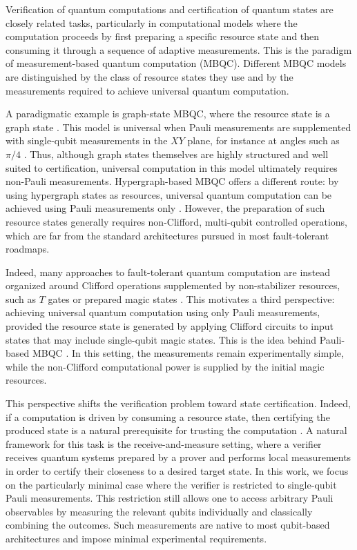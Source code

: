 \documentclass[a4paper,twocolumn,11pt,unpublished]{quantumarticle}
\begin{document}
Verification of quantum computations and certification of quantum states are closely related tasks, particularly in computational models where the computation proceeds by first preparing a specific resource state and then consuming it through a sequence of adaptive measurements. This is the paradigm of measurement-based quantum computation (MBQC). Different MBQC models are distinguished by the class of resource states they use and by the measurements required to achieve universal quantum computation.

A paradigmatic example is graph-state MBQC, where the resource state is a graph state
\cite{RB01one}. This model is universal when Pauli measurements are supplemented with single-qubit measurements in the $XY$ plane, for instance at angles such as $\pi/4$ \cite{DKP07measurement}. Thus, although graph states themselves are highly structured and well suited to certification, universal computation in this model ultimately requires non-Pauli measurements. Hypergraph-based MBQC offers a different route: by using hypergraph states as resources, universal quantum computation can be achieved using Pauli measurements only \cite{TMH18quantum}. However, the preparation of such resource states generally requires non-Clifford, multi-qubit controlled operations, which are far from the standard architectures pursued in most fault-tolerant roadmaps.

Indeed, many approaches to fault-tolerant quantum computation are instead organized around Clifford operations supplemented by non-stabilizer resources, such as $T$ gates or prepared magic states
\cite{DBMA25breaking, G23cleaner, AAAA22suppressing, MGCM25ibm, GSJ24magic}.
This motivates a third perspective: achieving universal quantum computation using only Pauli measurements, provided the resource state is generated by applying Clifford circuits to input states that may include single-qubit magic states. This is the idea behind Pauli-based MBQC \cite{SDKO07direct}. In this setting, the measurements remain experimentally simple, while the non-Clifford computational power is supplied by the initial magic resources.

This perspective shifts the verification problem toward state certification. Indeed, if a computation is driven by consuming a resource state, then certifying the produced state is a natural prerequisite for trusting the computation \cite{FFS26}. A natural framework for this task is the receive-and-measure setting, where a verifier receives quantum systems prepared by a prover and performs local measurements in order to certify their closeness to a desired target state. In this work, we focus on the particularly minimal case where the verifier is restricted to single-qubit Pauli measurements. This restriction still allows one to access arbitrary Pauli observables by measuring the relevant qubits individually and classically combining the outcomes. Such measurements are native to most qubit-based architectures and impose minimal experimental requirements.
\end{document}
